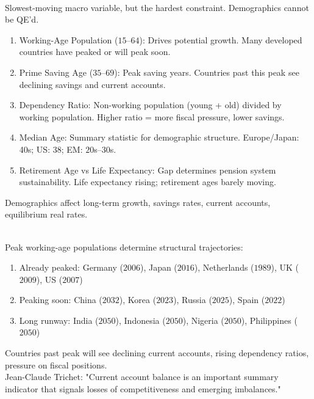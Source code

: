 \begin{remark} \\
Slowest-moving macro variable, but the hardest constraint. Demographics cannot be QE'd.
\begin{enumerate}[label=\roman*.]
\setlength{\itemsep}{0pt}
\item Working-Age Population ($15$--$64$): Drives potential growth. Many developed countries have peaked or will peak soon.
\item Prime Saving Age ($35$--$69$): Peak saving years. Countries past this peak see declining savings and current accounts.
\item Dependency Ratio: Non-working population (young + old) divided by working population. Higher ratio = more fiscal pressure, lower savings.
\item Median Age: Summary statistic for demographic structure. Europe/Japan: 40s; US: 38; EM: $20$s--$30$s.
\item Retirement Age vs Life Expectancy: Gap determines pension system sustainability. Life expectancy rising; retirement ages barely moving.
\end{enumerate}
Demographics affect long-term growth, savings rates, current accounts, equilibrium real rates.
\end{remark}

\begin{remark} \\
Peak working-age populations determine structural trajectories:
\begin{enumerate}[label=\roman*.]
\setlength{\itemsep}{0pt}
\item Already peaked: Germany ($2006$), Japan ($2016$), Netherlands ($1989$), UK ($2009$), US ($2007$)
\item Peaking soon: China ($2032$), Korea ($2023$), Russia ($2025$), Spain ($2022$)
\item Long runway: India ($2050$), Indonesia ($2050$), Nigeria ($2050$), Philippines ($2050$)
\end{enumerate}
Countries past peak will see declining current accounts, rising dependency ratios, pressure on fiscal positions.\\
Jean-Claude Trichet: "Current account balance is an important summary indicator that signals losses of competitiveness and emerging imbalances."
\end{remark}

